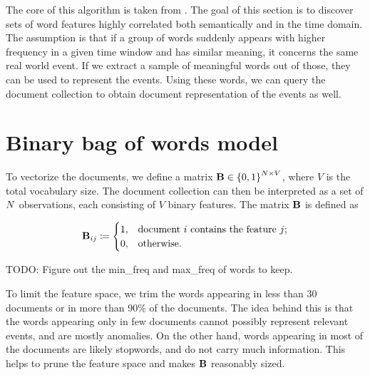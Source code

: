 

\newcommand{\featcount}{V}
\newcommand{\traj}{y}
\newcommand{\embed}{\vect{v}}
\newcommand{\df}{DF}
\newcommand{\featset}{\text{M}}
\newcommand{\cost}{\text{C}}

\newcommand{\semsim}{\text{Sim}}
\newcommand{\featsim}{\text{JSD}}

\newcommand{\bowmat}{\mat{B}}
\newcommand{\dtdmat}{\mat{D}}
\newcommand{\trajmat}{\mat{T}}


The core of this algorithm is taken from \cite{event-detection}. The goal of this section is to discover sets of word features highly correlated both semantically and in the time domain. The assumption is that if a group of words suddenly appears with higher frequency in a given time window and has similar meaning, it concerns the same real world event. If we extract a sample of meaningful words out of those, they can be used to represent the events. Using these words, we can query the document collection to obtain document representation of the events as well.


\section{Binary bag of words model}
To vectorize the documents, we define a matrix $\bowmat \in \left\{ 0, 1 \right\}^{\doccount \times \featcount}$, where $\featcount$ is the total vocabulary size. The document collection can then be interpreted as a set of $N$ observations, each consisting of $\featcount$ binary features. The matrix $\bowmat$ is defined as

\begin{equation} \label{eq:bow-matrix}
	\bowmat_{ij} \coloneqq
	\begin{cases}
		1, & \text{document}~i~\text{contains the feature}~j \text{;} \\
		0, & \text{otherwise.}
	\end{cases}
\end{equation}

{\color{red} TODO: Figure out the min\_freq and max\_freq of words to keep.}

To limit the feature space, we trim the words appearing in less than 30 documents or in more than 90\% of the documents. The idea behind this is that the words appearing only in few documents cannot possibly represent relevant events, and are mostly anomalies. On the other hand, words appearing in most of the documents are likely stopwords, and do not carry much information. This helps to prune the feature space and makes $\bowmat$ reasonably sized.

